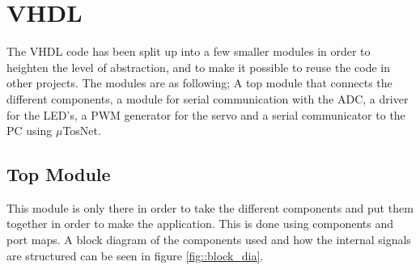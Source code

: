 \section{VHDL}
The VHDL code has been split up into a few smaller modules in order to heighten the level of abstraction, and to make it possible to reuse the code in other projects. The modules are as following; A top module that connects the different components, a module for serial communication with the ADC, a driver for the LED's, a PWM generator for the servo and a serial communicator to the PC using $\mu$TosNet.
\subsection{Top Module}
This module is only there in order to take the different components and put them together in order to make the application. This is done using components and port maps. A block diagram of the components used and how the internal signals are structured can be seen in figure \ref{fig::block_dia}.

